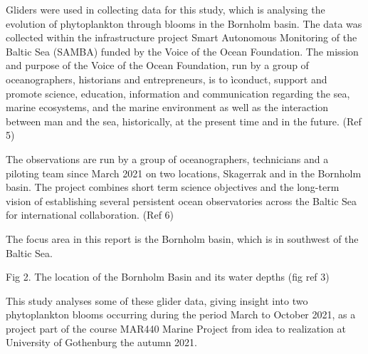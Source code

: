 \documentclass[../Main.tex]{subfiles}
\begin{document}
Gliders were used in collecting data for this study, which is analysing the evolution of phytoplankton through blooms in the Bornholm basin. The data was collected within the infrastructure project Smart Autonomous Monitoring of the Baltic Sea (SAMBA) funded by the Voice of the Ocean Foundation. The mission and purpose of the Voice of the Ocean Foundation, run by a group of oceanographers, historians and entrepreneurs, is to ìconduct, support and promote science, education, information and communication regarding the sea, marine ecosystems, and the marine environment as well as the interaction between man and the sea, historically, at the present time and in the future.  (Ref 5)

The observations are run by a group of oceanographers, technicians and a piloting team since March 2021 on two locations, Skagerrak and in the Bornholm basin. The project combines short term science objectives and the long-term vision of establishing several persistent ocean observatories across the Baltic Sea for international collaboration. (Ref 6)

The focus area in this report is the Bornholm basin, which is in southwest of the Baltic Sea.



Fig 2. The location of the Bornholm Basin and its water depths (fig ref 3)

This study analyses some of these glider data, giving insight into two phytoplankton blooms occurring during the period March to October 2021, as a project part of the course MAR440 Marine Project from idea to realization at University of Gothenburg the autumn 2021.
\end{document}
